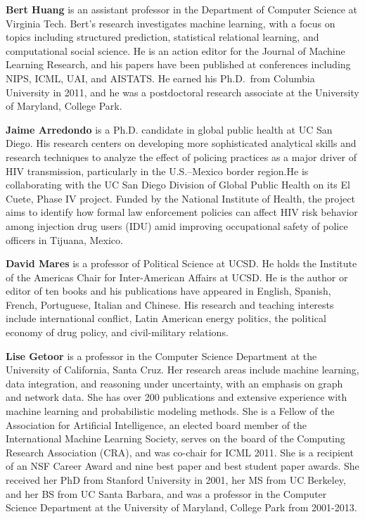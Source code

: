 \documentclass[letterpaper]{article}
\begin{document}
{\bf Bert Huang} is an assistant professor in the Department of Computer
Science at Virginia Tech. Bert’s research investigates machine
learning, with a focus on topics including structured prediction,
statistical relational learning, and computational social science. He is
an action editor for the Journal of Machine Learning Research, and his
papers have been published at conferences including NIPS, ICML, UAI, and
AISTATS. He earned his Ph.D.~from Columbia University
in 2011, and he was a postdoctoral research associate at the University
of Maryland, College Park.
\par

{\bf Jaime Arredondo} is a Ph.D. candidate in global public health at UC San
Diego. His research centers on developing more sophisticated analytical
skills and research techniques to analyze the effect of policing
practices as a major driver of HIV transmission, particularly in the
U.S.–Mexico border region.He is collaborating with the UC San Diego Division of Global
Public Health on its El Cuete, Phase IV project. Funded by the National
Institute of Health, the project aims to identify how formal law
enforcement policies can affect HIV risk behavior among injection drug
users (IDU) amid improving occupational safety of police officers in
Tijuana, Mexico.
\par
{\bf David Mares} is a professor of Political Science at UCSD.
He holds the Institute of the Americas Chair for Inter-American Affairs at UCSD.
He is the author or editor of ten books
and his publications have appeared in English, Spanish, French,
Portuguese, Italian and Chinese. His research and teaching interests
include international conflict, Latin American energy politics, the
political economy of drug policy, and civil-military relations.
\par

{\bf Lise Getoor} is a professor in the Computer Science Department at the
University of California, Santa Cruz.   Her research areas include
machine learning, data integration, and reasoning under uncertainty,
with an emphasis on graph and network data. She has over 200
publications and extensive experience with machine learning and
probabilistic modeling methods.  She is a Fellow of the Association for
Artificial Intelligence, an elected board member of the International
Machine Learning Society, serves on the board of the Computing Research
Association (CRA), and was co-chair for ICML 2011.  She is a recipient
of an NSF Career Award and nine best paper and best student paper
awards.  She received her PhD from Stanford University in 2001, her MS
from UC Berkeley, and her BS from UC Santa Barbara, and was a professor
in the Computer Science Department at the University of Maryland,
College Park from 2001-2013.
\par
\end{document}
